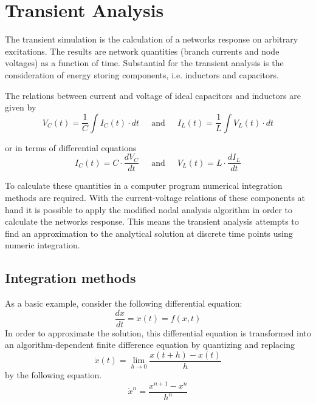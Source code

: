 %
%
%
%

\chapter{Transient Analysis}

The transient simulation is the calculation of a networks response on
arbitrary excitations.  The results are network quantities (branch
currents and node voltages) as a function of time.  Substantial for
the transient analysis is the consideration of energy storing
components, i.e. inductors and capacitors.

\addvspace{12pt}

The relations between current and voltage of ideal capacitors and
inductors are given by
\begin{equation}
V_C(t) = \dfrac{1}{C}\int I_C(t) \cdot dt
\;\;\;\; \textrm{ and } \;\;\;\;
I_L(t) = \dfrac{1}{L}\int V_L(t) \cdot dt
\end{equation}

or in terms of differential equations
\begin{equation}
I_C(t) = C\cdot \dfrac{d V_C}{d t}
\;\;\;\; \textrm{ and } \;\;\;\;
V_L(t) = L\cdot \dfrac{d I_L}{d t}
\end{equation}

To calculate these quantities in a computer program numerical
integration methods are required.  With the current-voltage relations
of these components at hand it is possible to apply the modified nodal
analysis algorithm in order to calculate the networks response.  This
means the transient analysis attempts to find an approximation to the
analytical solution at discrete time points using numeric integration.

\section{Integration methods}
\label{sec:IntegrationMethods}

As a basic example, consider the following differential equation:
\begin{equation}
\dfrac{d x}{d t} = \dot{x}(t) = f(x,t)
\label{eq:IntEquation}
\end{equation}
In order to approximate the solution, this differential equation is
transformed into an algorithm-dependent
finite difference equation by quantizing and replacing
\begin{equation}
\dot{x}(t) = \lim_{h \rightarrow 0} \dfrac{x(t+h) - x(t)}{h}
\end{equation}
by the following equation.
\begin{equation}
\dot{x}^n = \dfrac{x^{n+1} - x^{n}}{h^{n}}
\end{equation}

